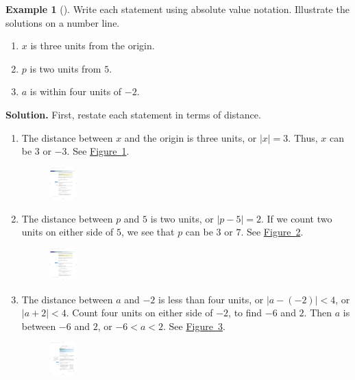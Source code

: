 \documentclass[10pt,]{book}
\theoremstyle{plain}
\theoremstyle{definition}
\theoremstyle{definition}
\theoremstyle{definition}
\newtheorem{example}[theorem]{Example}
\theoremstyle{definition}
\theoremstyle{definition}
\numberwithin{equation}{section}
\newcommand\abs[1]{\left|#1\right|}
\newcommand{\lt}{ < }
\begin{document}
\begin{example}[]\label{example-distances}
Write each statement using absolute value notation. Illustrate the solutions on a number line.%
\leavevmode%
\begin{enumerate}[label=*\alph**]
\item\hypertarget{li-343}{}\(x\) is three units from the origin.\item\hypertarget{li-344}{}\(p\) is two units from \(5\).\item\hypertarget{li-345}{}\(a\) is within four units of \(−2\).\end{enumerate}
\par\medskip\noindent%
\textbf{Solution.}\quad 
        First, restate each statement in terms of distance.
\leavevmode%
\begin{enumerate}[label=*\alph**]
\item\hypertarget{li-346}{}The distance between \(x\) and the origin is three units, or \(\abs{x} = 3\). Thus, \(x\) can be \(3\) or \(−3\). See \hyperref[fig-abs-x-is-3]{Figure~\ref{fig-abs-x-is-3}}.
        \leavevmode%
\begin{figure}
\centering
\includegraphics[width=0.100\textwidth,]{images/fig-abs-x-is-3.pdf}\caption{\label{fig-abs-x-is-3}}
\end{figure}
\item\hypertarget{li-347}{}The distance between \(p\) and \(5\) is two units, or 
        \(\abs{p − 5} = 2\). If we count two units on either side of \(5\), we see that \(p\) can be \(3\) or \(7\). See \hyperref[fig-abs-p-minus-5-is-2]{Figure~\ref{fig-abs-p-minus-5-is-2}}.
        \leavevmode%
\begin{figure}
\centering
\includegraphics[width=0.100\textwidth,]{images/fig-abs-p-minus-5-is-2.pdf}\caption{\label{fig-abs-p-minus-5-is-2}}
\end{figure}
\item\hypertarget{li-348}{}The distance between \(a\) and \(−2\) is less than four units, or \(\abs{a − (−2)} \lt 4\), or \(\abs{a + 2} \lt 4\). Count four units on either side of \(−2\), to find \(−6\) and \(2\). Then \(a\) is between \(−6\) and \(2\), or \(−6 \lt a \lt 2\). 
        See \hyperref[fig-4-units-from-negative-2]{Figure~\ref{fig-4-units-from-negative-2}}.
        \leavevmode%
\begin{figure}
\centering
\includegraphics[width=0.100\textwidth,]{images/fig-4-units-from-negative-2.pdf}\caption{\label{fig-4-units-from-negative-2}}
\end{figure}
\end{enumerate}
\end{example}
\end{document}
